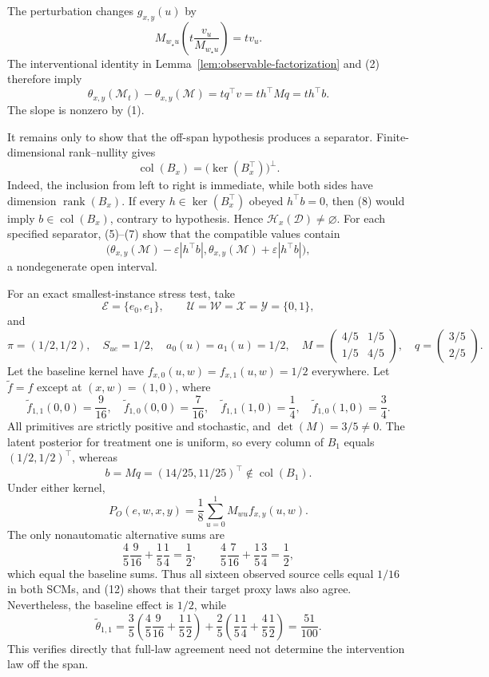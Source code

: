 The perturbation changes \(g_{x,y}(u)\) by
\[
M_{w_{\star}u}\left(t\frac{v_u}{M_{w_{\star}u}}\right)=tv_u.
\tag{6}
\]
The interventional identity in Lemma~\ref{lem:observable-factorization} and (2) therefore imply
\[
\theta_{x,y}(\mathcal M_t)-\theta_{x,y}(\mathcal M)
=tq^{\top}v
=t h^{\top}Mq
=t h^{\top}b.
\tag{7}
\]
The slope is nonzero by (1).

It remains only to show that the off-span hypothesis produces a separator.  Finite-dimensional rank--nullity gives
\[
\operatorname{col}(B_x)=\bigl(\ker(B_x^{\top})\bigr)^{\perp}.
\tag{8}
\]
Indeed, the inclusion from left to right is immediate, while both sides have dimension \(\operatorname{rank}(B_x)\).  If every \(h\in\ker(B_x^{\top})\) obeyed \(h^{\top}b=0\), then (8) would imply \(b\in\operatorname{col}(B_x)\), contrary to hypothesis.  Hence \(\mathcal H_x(\mathcal D)\ne\varnothing\).  For each specified separator, (5)--(7) show that the compatible values contain
\[
\bigl(\theta_{x,y}(\mathcal M)-\varepsilon|h^{\top}b|,
      \theta_{x,y}(\mathcal M)+\varepsilon|h^{\top}b|\bigr),
\tag{9}
\]
a nondegenerate open interval.

For an exact smallest-instance stress test, take
\[
\mathcal E=\{e_0,e_1\},
\qquad
\mathcal U=\mathcal W=\mathcal X=\mathcal Y=\{0,1\},
\]
and
\[
\pi=(1/2,1/2),\quad S_{ue}=1/2,\quad
a_0(u)=a_1(u)=1/2,\quad
M=\begin{pmatrix}4/5&1/5\\1/5&4/5\end{pmatrix},\quad
q=\begin{pmatrix}3/5\\2/5\end{pmatrix}.
\tag{10}
\]
Let the baseline kernel have \(f_{x,0}(u,w)=f_{x,1}(u,w)=1/2\) everywhere.  Let \(\widetilde f=f\) except at \((x,w)=(1,0)\), where
\[
\widetilde f_{1,1}(0,0)=\frac9{16},\quad
\widetilde f_{1,0}(0,0)=\frac7{16},\quad
\widetilde f_{1,1}(1,0)=\frac14,\quad
\widetilde f_{1,0}(1,0)=\frac34.
\tag{11}
\]
All primitives are strictly positive and stochastic, and \(\det(M)=3/5\ne0\).  The latent posterior for treatment one is uniform, so every column of \(B_1\) equals \((1/2,1/2)^{\top}\), whereas
\[
b=Mq=(14/25,11/25)^{\top}\notin\operatorname{col}(B_1).
\tag{12}
\]
Under either kernel,
\[
P_O(e,w,x,y)=\frac18\sum_{u=0}^1M_{wu}f_{x,y}(u,w).
\tag{13}
\]
The only nonautomatic alternative sums are
\[
\frac45\frac9{16}+\frac15\frac14=\frac12,
\qquad
\frac45\frac7{16}+\frac15\frac34=\frac12,
\tag{14}
\]
which equal the baseline sums.  Thus all sixteen observed source cells equal \(1/16\) in both SCMs, and (12) shows that their target proxy laws also agree.  Nevertheless, the baseline effect is \(1/2\), while
\[
\widetilde\theta_{1,1}
=\frac35\left(\frac45\frac9{16}+\frac15\frac12\right)
 +\frac25\left(\frac15\frac14+\frac45\frac12\right)
=\frac{51}{100}.
\tag{15}
\]
This verifies directly that full-law agreement need not determine the intervention law off the span.